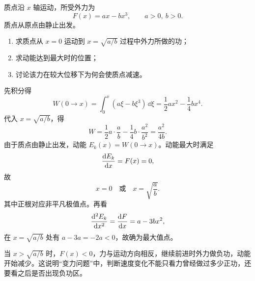 \begin{competition}
质点沿 $x$ 轴运动，所受外力为
\[
F(x)=ax-bx^3,\qquad a>0,\ b>0.
\]
质点从原点由静止出发。
\begin{enumerate}
  \item 求质点从 $x=0$ 运动到 $x=\sqrt{a/b}$ 过程中外力所做的功；
  \item 求动能达到最大时的位置；
  \item 讨论该力在较大位移下为何会使质点减速。
\end{enumerate}
\begin{solution}
先积分得
\[
W(0\to x)=\int_0^x (a\xi-b\xi^3)\,\dd \xi=\frac12 ax^2-\frac14 bx^4.
\]
代入 $x=\sqrt{a/b}$，得
\[
W=\frac12 a\cdot \frac{a}{b}-\frac14 b\cdot \frac{a^2}{b^2}=\frac{a^2}{4b}.
\]
由于质点由静止出发，动能 $E_k(x)=W(0\to x)$。动能最大时满足
\[
\dv{E_k}{x}=F(x)=0,
\]
故
\[
x=0\quad \text{或}\quad x=\sqrt{\frac{a}{b}}.
\]
其中正根对应非平凡极值点。再看
\[
\dv[2]{E_k}{x}=\dv{F}{x}=a-3bx^2,
\]
在 $x=\sqrt{a/b}$ 处有 $a-3a=-2a<0$，故确为最大值点。

当 $x>\sqrt{a/b}$ 时，$F(x)<0$，力与运动方向相反，继续前进时外力做负功，动能开始减少。这说明“变力问题”中，判断速度变化不能只看力曾经做过多少正功，还要看之后是否出现负功区。
\end{solution}
\end{competition}


